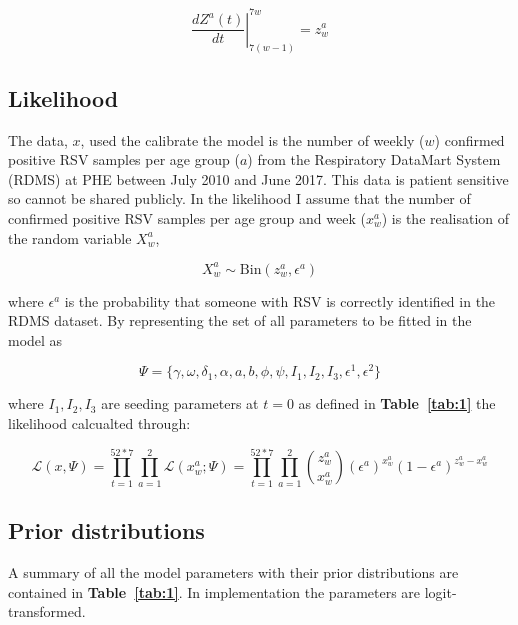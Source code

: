 \documentclass[10pt,twoside]{report} %
\begin{document}
 \begin{equation}
 \left. \frac{dZ^a(t)}{dt}\right|_{7(w-1)}^{7w} = z_w^a
 \end{equation}



\subsection{Likelihood}

The data, $x$, used the calibrate the model is the number of weekly ($w$) confirmed positive RSV samples per age group ($a$) from the Respiratory DataMart System (RDMS) at PHE between July 2010 and June 2017. This data is patient sensitive so cannot be shared publicly. In the likelihood I assume that the number of confirmed positive RSV samples per age group and week ($x_w^a$) is the realisation of the random variable $X_w^a$,

\begin{equation}
X_w^a \sim \text{Bin}\left(z_w^a, \epsilon^a\right)
\end{equation}

where $\epsilon^a$ is the probability that someone with RSV is correctly identified in the RDMS dataset. By representing the set of all parameters to be fitted in the model as 

$$\Psi = \{\gamma, \omega, \delta_1, \alpha ,a, b, \phi, \psi, I_1, I_2, I_3, \epsilon^1, \epsilon^2\}$$

where $I_1, I_2, I_3$ are seeding parameters at $t=0$ as defined in \textbf{Table~\ref{tab:1}} the likelihood calcualted through:

\begin{equation}
\label{eq6}
\mathcal{L}(x, \Psi) = \prod_{t=1}^{52*7}\prod_{a=1}^2 \mathcal{L}(x_w^{a}; \Psi) = \prod_{t=1}^{52*7}\prod_{a=1}^2 \binom{z^a_w}{x^a_w}(\epsilon^a)^{x^a_w}(1-\epsilon^a)^{z^a_w-x^a_w}
\end{equation}


\subsection{Prior distributions}

A summary of all the model parameters with their prior distributions are contained in \textbf{Table~\ref{tab:1}}. In implementation the parameters are logit-transformed.
\end{document}
